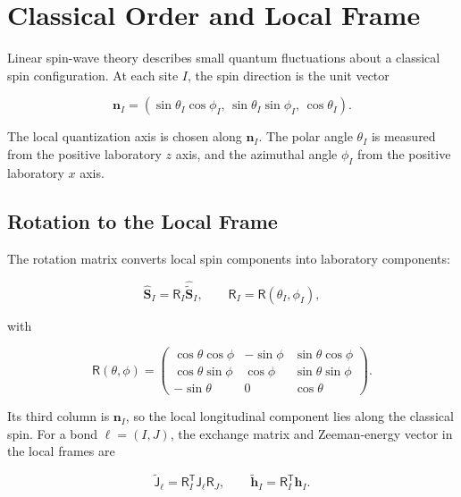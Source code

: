 
\hypertarget{sec-lswt-classical-order-and-local-frame}{%
\section{Classical Order and Local Frame}\label{sec-lswt-classical-order-and-local-frame}}

Linear spin-wave theory describes small quantum fluctuations about a classical spin configuration. At each site \(I\), the spin direction is the unit vector

\[
\mathbf n_I
=(\sin\theta_I\cos\phi_I,\,
  \sin\theta_I\sin\phi_I,\,
  \cos\theta_I).
\]

The local quantization axis is chosen along \(\mathbf n_I\). The polar angle \(\theta_I\) is measured from the positive laboratory \(z\) axis, and the azimuthal angle \(\phi_I\) from the positive laboratory \(x\) axis.

\subsection{Rotation to the Local Frame}

The rotation matrix converts local spin components into laboratory components:

\[
\hat{\mathbf S}_I=\mathsf R_I\hat{\widetilde{\mathbf S}}_I,
\qquad
\mathsf R_I=\mathsf R(\theta_I,\phi_I),
\]

with

\[
\mathsf R(\theta,\phi)=
\begin{pmatrix}
\cos\theta\cos\phi & -\sin\phi & \sin\theta\cos\phi\\
\cos\theta\sin\phi &  \cos\phi & \sin\theta\sin\phi\\
-\sin\theta & 0 & \cos\theta
\end{pmatrix}.
\]

Its third column is \(\mathbf n_I\), so the local longitudinal component lies along the classical spin. For a bond \(\ell=(I,J)\), the exchange matrix and Zeeman-energy vector in the local frames are

\[
\widetilde{\mathsf J}_\ell
=\mathsf R_I^{\mathsf T}\mathsf J_\ell\mathsf R_J,
\qquad
\widetilde{\mathbf h}_I=\mathsf R_I^{\mathsf T}\mathbf h_I.
\]

